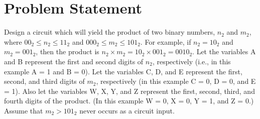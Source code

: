 \documentclass{report}
\begin{document}

\section{Problem Statement}
    Design a circuit which will yield the product of two binary numbers, $n_2$
    and $m_2$, where $00_2 \le n_2 \le 11_2$ and $000_2 \le m_2 \le 101_2$. For
    example, if $n_2 = 10_2$ and $m_2 = 001_2$, then the product is $n_2 \times
    m_2 = 10_2 \times 001_2 = 0010_2$. Let the variables A and B represent the
    first and second digits of $n_2$, respectively (i.e., in this example A = 1
    and B = 0). Let the variables C, D, and E represent the first, second, and
    third digits of $m_2$, respectively (in this example C = 0, D = 0, and E =
    1). Also let the variables W, X, Y, and Z represent the first, second,
    third, and fourth digits of the product. (In this example W = 0, X = 0, Y =
    1, and Z = 0.) Assume that $m_2 > 101_2$ never occurs as a circuit input.
    
\end{document}
